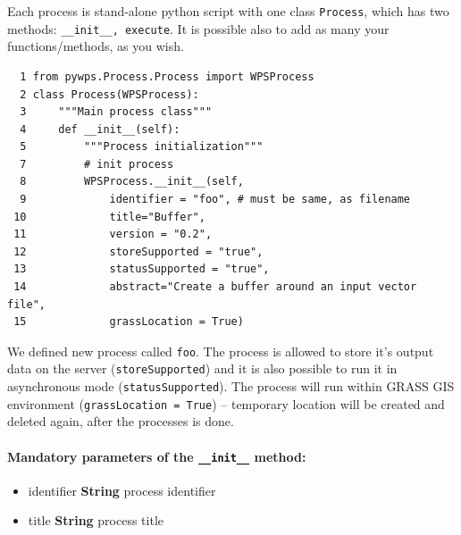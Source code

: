 \documentclass[a4paper,11pt]{report}
\begin{document}
Each process is stand-alone python script with one class \texttt{Process},
which has two methods: \texttt{\_\_init\_\_, execute}. It is possible also to add as 
many your functions/methods, as you wish.
    

\begin{verbatim}
  1 from pywps.Process.Process import WPSProcess                                
  2 class Process(WPSProcess):
  3     """Main process class"""
  4     def __init__(self):
  5         """Process initialization"""
  7         # init process
  8         WPSProcess.__init__(self,
  9             identifier = "foo", # must be same, as filename
 10             title="Buffer",
 11             version = "0.2",
 12             storeSupported = "true",
 13             statusSupported = "true",
 14             abstract="Create a buffer around an input vector file",
 15             grassLocation = True)
\end{verbatim}

We defined new process called \texttt{foo}. The process is allowed to
store it's output data on the server (\texttt{storeSupported}) and it is also possible to run it in
asynchronous mode (\texttt{statusSupported}). The process will run within
GRASS GIS environment (\texttt{grassLocation = True}) -- temporary location
will be created and deleted again, after the processes is done.


\paragraph{Mandatory parameters of the \texttt{\_\_init\_\_} method:}
\begin{itemize}
\item    identifier \textbf{String} process identifier
\item    title \textbf{String} process title
\end{itemize}
\end{document}

